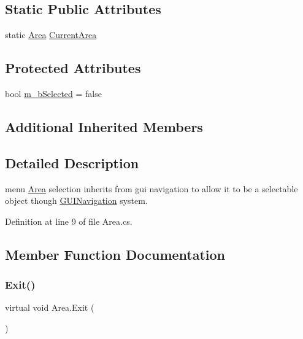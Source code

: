 \subsection*{Static Public Attributes}
\begin{DoxyCompactItemize}
\item 
static \mbox{\hyperlink{class_area}{Area}} \mbox{\hyperlink{class_area_a1e0e079dfe5003bb20f72e086718d036}{Current\+Area}}
\end{DoxyCompactItemize}
\subsection*{Protected Attributes}
\begin{DoxyCompactItemize}
\item 
bool \mbox{\hyperlink{class_area_a056631a7e8d58f900cb1f4eeb9f728a9}{m\+\_\+b\+Selected}} = false
\end{DoxyCompactItemize}
\subsection*{Additional Inherited Members}


\subsection{Detailed Description}
menu \mbox{\hyperlink{class_area}{Area}} selection inherits from gui navigation to allow it to be a selectable object though \mbox{\hyperlink{class_g_u_i_navigation}{G\+U\+I\+Navigation}} system. 



Definition at line 9 of file Area.\+cs.



\subsection{Member Function Documentation}
\mbox{\label{class_area_a96ef46550ca800c223f4db8f0b93e86b}} 
\subsubsection{\texorpdfstring{Exit()}{Exit()}}
{\footnotesize\ttfamily virtual void Area.\+Exit (\begin{DoxyParamCaption}{ }\end{DoxyParamCaption})\hspace{0.3cm}{\ttfamily [virtual]}}



